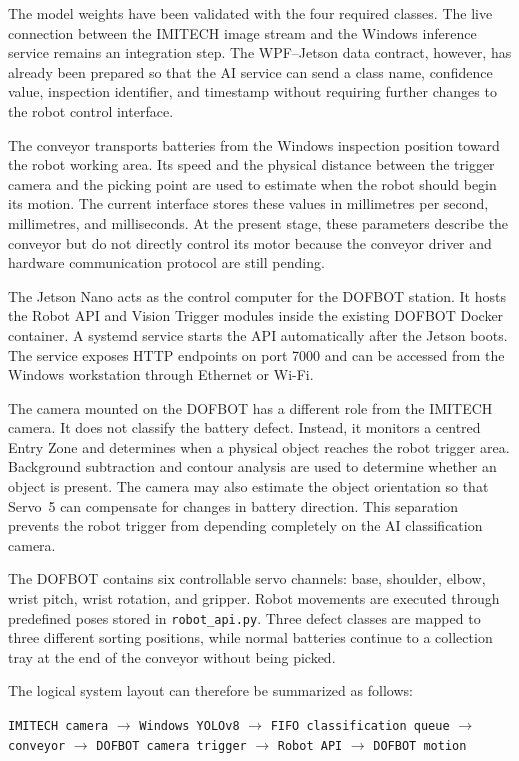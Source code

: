 The model weights have been validated with the four required classes. The live connection between the IMITECH image stream and the Windows inference service remains an integration step. The WPF--Jetson data contract, however, has already been prepared so that the AI service can send a class name, confidence value, inspection identifier, and timestamp without requiring further changes to the robot control interface.

The conveyor transports batteries from the Windows inspection position toward the robot working area. Its speed and the physical distance between the trigger camera and the picking point are used to estimate when the robot should begin its motion. The current interface stores these values in millimetres per second, millimetres, and milliseconds. At the present stage, these parameters describe the conveyor but do not directly control its motor because the conveyor driver and hardware communication protocol are still pending.

The Jetson Nano acts as the control computer for the DOFBOT station. It hosts the Robot API and Vision Trigger modules inside the existing DOFBOT Docker container. A systemd service starts the API automatically after the Jetson boots. The service exposes HTTP endpoints on port 7000 and can be accessed from the Windows workstation through Ethernet or Wi-Fi.

The camera mounted on the DOFBOT has a different role from the IMITECH camera. It does not classify the battery defect. Instead, it monitors a centred Entry Zone and determines when a physical object reaches the robot trigger area. Background subtraction and contour analysis are used to determine whether an object is present. The camera may also estimate the object orientation so that Servo~5 can compensate for changes in battery direction. This separation prevents the robot trigger from depending completely on the AI classification camera.

The DOFBOT contains six controllable servo channels: base, shoulder, elbow, wrist pitch, wrist rotation, and gripper. Robot movements are executed through predefined poses stored in \texttt{robot\_api.py}. Three defect classes are mapped to three different sorting positions, while normal batteries continue to a collection tray at the end of the conveyor without being picked.

The logical system layout can therefore be summarized as follows:

\begin{center}
\texttt{IMITECH camera} $\rightarrow$ \texttt{Windows YOLOv8} $\rightarrow$ \texttt{FIFO classification queue} $\rightarrow$ \texttt{conveyor} $\rightarrow$ \texttt{DOFBOT camera trigger} $\rightarrow$ \texttt{Robot API} $\rightarrow$ \texttt{DOFBOT motion}
\end{center}

